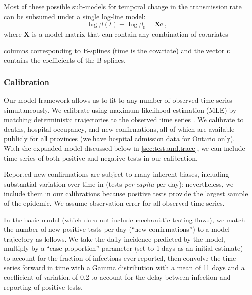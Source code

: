 \documentclass[12pt]{article}\usepackage[]{graphicx}\usepackage[]{color}
\begin{document}
Most of these possible sub-models for temporal change in the transmission
rate can be subsumed under a single log-line model:
\begin{equation}\label{eq:betamodel}
\log \beta(t) = \log \beta_0 + \boldsymbol{X}\boldsymbol{c}
\,,
\end{equation}
where $\boldsymbol{X}$ is a model matrix that can contain any combination
of covariates.

columns corresponding to B-splines (time is the covariate) and the
vector $\boldsymbol{c}$ contains the coefficients of the B-splines.


\subsubsection*{Calibration}

Our model framework allows us to fit to any number of observed time
series simultaneously.  We calibrate using
maximum likelihood estimation (MLE) by matching deterministic
trajectories to the observed time series \cite{Bolk08}.  We calibrate
to deaths, hospital occupancy, and new confirmations, all of which are
available publicly for all provinces (we have hospital admission data
for Ontario only).  With the expanded model discussed below in
\cref{sec:test.and.trace}, we can include time series of both positive
and negative tests in our calibration.

Reported new confirmations are subject to many inherent biases,
including substantial variation over time in 
(\ie tests \emph{per capita} per day); nevertheless, we include them
in our calibrations because positive tests provide the largest sample
of the epidemic.  We assume
 observation error for all observed time series.

In the basic model (which does not include mechanistic testing flows),
we match the number of new positive tests per day (``new
confirmations'') to a model trajectory as follows.  We take the daily
incidence predicted by the model, multiply by a ``case proportion''
parameter  (set to 1 days as an
initial estimate) to account for the fraction of infections ever
reported, then convolve the time series forward in time with a Gamma
distribution with a mean of 11 days and a coefficient of
variation of 0.2 to account for the delay between infection
and reporting of positive tests.  
\end{document}
